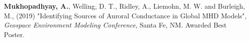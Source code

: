 \documentclass[10pt]{article}
\begin{document}
{{\textbf{Mukhopadhyay, A.}, Welling, D. T., Ridley, A., Liemohn, M. W. and Burleigh, M., (2019) "Identifying Sources of Auroral Conductance in Global MHD Models", \textit{Geospace Environment Modeling Conference}, Santa Fe, NM. {\color{mich_gold} Awarded Best Poster.} \vspace{0.5em}





\vspace{0.5em}



}}
\end{document}
